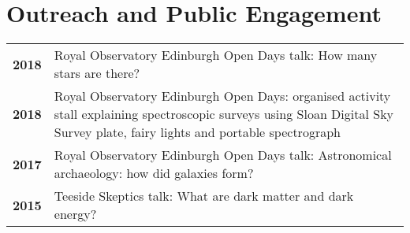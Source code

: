 \documentclass[a4paper,fleqn,usenatbib,onecolumn]{mnras}
\begin{document}
\section*{Outreach and Public Engagement}
\begingroup
\setlength{\tabcolsep}{0pt} %
\renewcommand{\arraystretch}{1.4} %
\begin{longtable}{ p{2cm} p{15cm} }

\bf{2018} & Royal Observatory Edinburgh Open Days talk: How many stars are there?\\

\bf{2018} & Royal Observatory Edinburgh Open Days: organised activity stall explaining spectroscopic surveys using Sloan Digital Sky Survey plate, fairy lights and portable spectrograph\\

\bf{2017} & Royal Observatory Edinburgh Open Days talk: Astronomical archaeology: how did galaxies form?\\

\bf{2015} & Teeside Skeptics talk: What are dark matter and dark energy?\\

\end{longtable}
\endgroup
\end{document}
